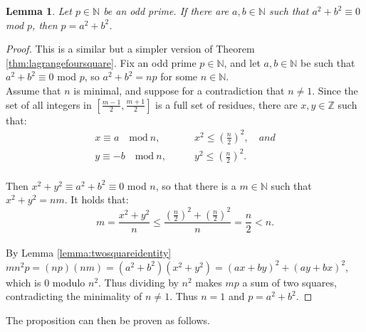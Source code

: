 \documentclass{report}
\newcommand{\N}{\mathbb{N}}
\newcommand{\Z}{\mathbb{Z}}
\newtheorem{lemma}[theorem]{Lemma}
\theoremstyle{definition}\newtheorem*{definition}{Definition}
\theoremstyle{definition}\newtheorem*{example}{Example}
\theoremstyle{remark}\newtheorem*{remark}{Remark}
\begin{document}
\begin{lemma}
\label{lemma:twosquaretheorem}
Let $ p \in \N $ be an odd prime. If there are $ a, b \in \N $ such that $ a^2 + b^2 \equiv 0 $ mod $ p $, then $ p = a^2 + b^2 $.
\end{lemma}

\begin{proof}
This is a similar but a simpler version of Theorem \ref{thm:lagrangefoursquare}. Fix an odd prime $ p \in \N $, and let $ a, b \in \N $ be such that $ a^2 + b^2 \equiv 0 $ mod $ p $, so $ a^2 + b^2 = np $ for some $ n \in \N $. \\
Assume that $ n $ is minimal, and suppose for a contradiction that $ n \ne 1 $. Since the set of all integers in $ \left[ \frac{m - 1}{2}, \frac{m + 1}{2} \right] $ is a full set of residues, there are $ x, y \in \Z $ such that:
\begin{align*}
x \equiv a \quad \text{mod} \ n, & \qquad x^2 \le \left( \frac{n}{2} \right)^2, \quad and \\
y \equiv -b \quad \text{mod} \ n, & \qquad y^2 \le \left( \frac{n}{2} \right)^2.
\end{align*} \\
Then $ x^2 + y^2 \equiv a^2 + b^2 \equiv 0 $ mod $ n $, so that there is a $ m \in \N $ such that $ x^2 + y^2 = nm $. It holds that: $$ m = \frac{x^2 + y^2}{n} \le \frac{\left( \frac{n}{2} \right)^2 + \left( \frac{n}{2} \right)^2}{n} = \frac{n}{2} < n. $$ \\
By Lemma \ref{lemma:twosquareidentity} $ mn^2 p = (np) (nm) = (a^2 + b^2) (x^2 + y^2) = (ax + by)^2 + (ay + bx)^2 $, which is $ 0 $ modulo $ n^2 $. Thus dividing by $ n^2 $ makes $ mp $ a sum of two squares, contradicting the minimality of $ n \ne 1 $. Thus $ n = 1 $ and $ p = a^2 + b^2 $.
\end{proof}

The proposition can then be proven as follows.
\end{document}
